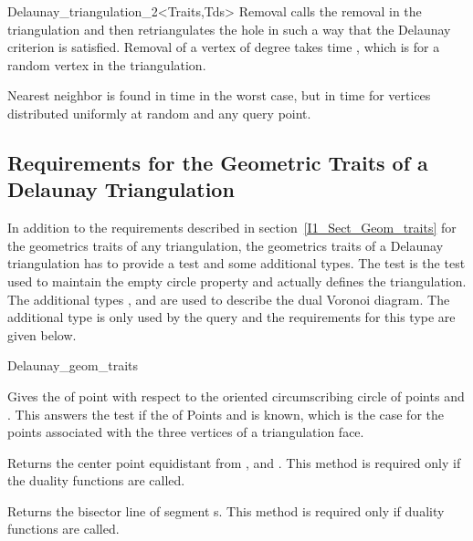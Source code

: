 \begin{ccClassTemplate} {Delaunay_triangulation_2<Traits,Tds>}
Removal calls the removal in the triangulation and then retriangulates
the hole in such a way that  the Delaunay criterion is satisfied. Removal of a
vertex of degree  takes time ,
which is  for a random
vertex in the triangulation.

Nearest neighbor is found in time  in the
worst case, but in time 
for vertices distributed uniformly at random  and any query point. 

\end{ccClassTemplate} 

\subsection{Requirements for the Geometric Traits of a Delaunay Triangulation}
\label{I1_Sect_Delaunay_geom_traits}

In addition to the requirements described in section~\ref{I1_Sect_Geom_traits}
for the geometrics traits of any triangulation,
the geometrics traits of a Delaunay triangulation
has to  provide a  test
and some additional types.
The  test is the test used to maintain the
empty circle property and actually defines the triangulation.
The additional types , 
and  are used to describe the dual Voronoi diagram.
The additional  type is only used by the
 query and the requirements for this type
are given below.
\begin{ccClass}{Delaunay_geom_traits}

\ccTypes
{}
\ccThreeToTwo
{}
\ccGlue
{}
\ccGlue
{}

\ccOperations
{}
{Gives the  of point  with respect to
the oriented circumscribing circle of  points  and .
This answers the   test if the 
of  Points  and  is known,
which is the case for the points associated with the three
vertices of a triangulation face.} 

 { Returns the center point equidistant from ,  and
. This method is required only if the duality functions are called.}

{Returns the bisector line of segment s. This method is required only if duality functions
are called.}

\end{ccClass}

